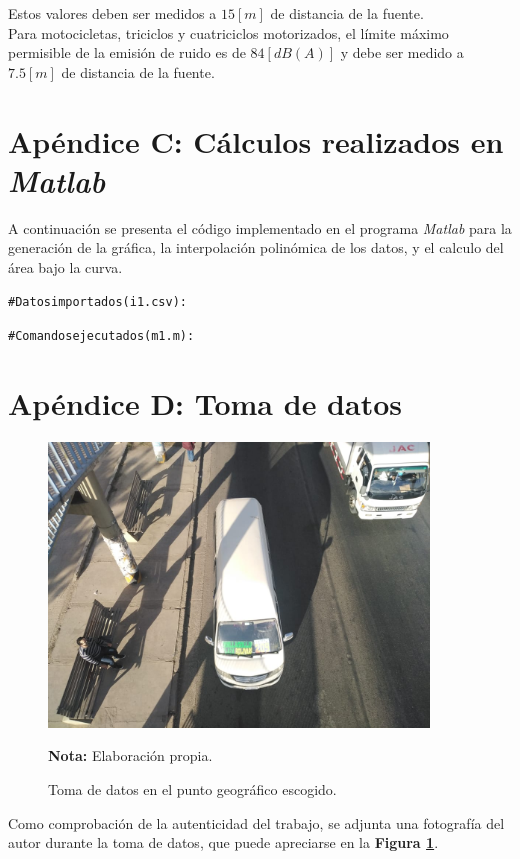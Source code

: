 \documentclass[letter,11pt]{article}
\newcommand{\source}[1]{\vspace{-11pt} \caption*{\small{\textbf{Nota:} {#1}}}}
\begin{document}
\begin{enumerate}
Estos valores deben ser medidos a $15 [m]$ de distancia de la fuente. \\

Para motocicletas, triciclos y cuatriciclos motorizados, el límite máximo
permisible de la emisión de ruido es de $84 [dB(A)]$ y debe ser medido a
$7.5 [m]$ de distancia de la fuente.
\end{enumerate}

\newpage
\section*{Apéndice C: Cálculos realizados en \emph{Matlab}}

A continuación se presenta el código implementado en el programa \emph{Matlab}
para la generación de la gráfica, la interpolación polinómica de los datos, y
el calculo del área bajo la curva.

\begin{shaded}
\begin{alltt}
\footnotesize
\# Datos importados (i1.csv):


\# Comandos ejecutados (m1.m):

\normalsize
\end{alltt}
\end{shaded}

\newpage
\section*{Apéndice D: Toma de datos}

\begin{figure}
\centering
\includegraphics[width=0.90\textwidth]{resources/f7.eps}
\caption{Toma de datos en el punto geográfico escogido.}
\label{figura7}
\source{Elaboración propia.}
\end{figure}

Como comprobación de la autenticidad del trabajo, se adjunta una fotografía del
autor durante la toma de datos, que puede apreciarse en la
\textbf{Figura \ref{figura7}}.
\end{document}
